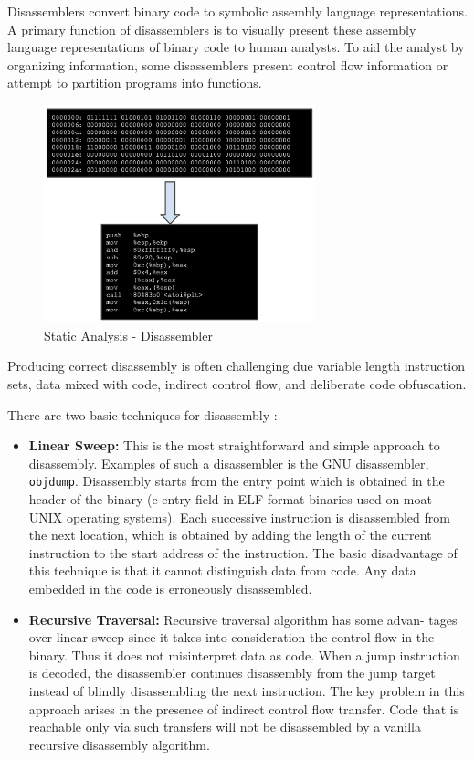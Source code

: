 \documentclass{article}
\begin{document}
Disassemblers convert binary code to symbolic assembly language representations. A primary function of disassemblers 
is to visually present these assembly language representations of binary code to human analysts. To aid the analyst 
by organizing information, some disassemblers present control ﬂow information or attempt to partition programs into 
functions. \citep{disass}
\begin{figure}[H]
\centering
\includegraphics[width=0.7\textwidth]{img/disassembler.jpg}
\caption{Static Analysis - Disassembler}
\label{fig:disassembler}
\end{figure}
Producing correct disassembly is often challenging due variable length instruction sets, data mixed with code,
indirect control ﬂow, and deliberate code obfuscation.

There are two basic techniques for disassembly \citep{stripped}:
\begin{itemize}
\item{\textbf{Linear Sweep:}} This is the most straightforward and simple approach to disassembly. 
Examples of such a disassembler is the GNU disassembler, \texttt{objdump}. Disassembly starts from the entry point which 
is obtained in the header of the binary (e entry field in ELF format binaries used on moat UNIX operating systems). 
Each successive instruction is disassembled from the next location, which is obtained by adding the length of the 
current instruction to the start address of the instruction. The basic disadvantage of this technique is that it 
cannot distinguish data from code. Any data embedded in the code is erroneously disassembled.
\item{\textbf{Recursive Traversal:}} Recursive traversal algorithm has some advan- tages over linear sweep since 
it takes into consideration the control flow in the binary. Thus it does not misinterpret data as code. When a 
jump instruction is decoded, the disassembler continues disassembly from the jump target instead of blindly 
disassembling the next instruction. The key problem in this approach arises in the presence of indirect control 
flow transfer. Code that is reachable only via such transfers will not be disassembled by a vanilla recursive 
disassembly algorithm.
\end{itemize}
\end{document}
